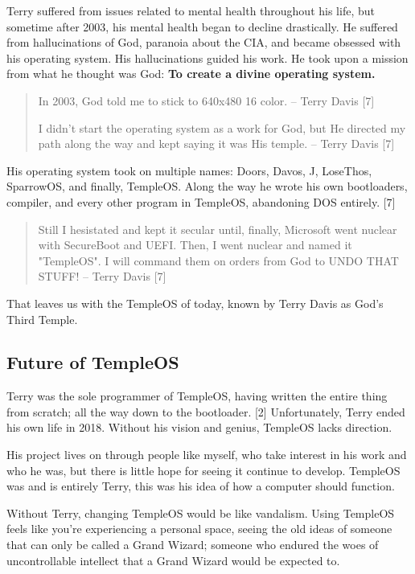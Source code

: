 \documentclass[11pt]{article}
\begin{document}
\newpage

Terry suffered from issues related to mental health throughout his life, but
sometime after 2003, his mental health began to decline drastically. He suffered
from hallucinations of God, paranoia about the CIA, and became obsessed with his
operating system. His hallucinations guided his work. He took upon a mission
from what he thought was God: \textbf{To create a divine operating system.}

\begin{quote}
In 2003, God told me to stick to 640x480 16 color. -- Terry Davis [7]

I didn't start the operating system as a work for God, but He directed my path
along the way and kept saying it was His temple. -- Terry Davis [7]
\end{quote}

His operating system took on multiple names: Doors, Davos, J, LoseThos,
SparrowOS, and finally, TempleOS. Along the way he wrote his own bootloaders,
compiler, and every other program in TempleOS, abandoning DOS entirely. [7]

\begin{quote}
Still I hesistated and kept it secular until, finally, Microsoft went nuclear
with SecureBoot and UEFI. Then, I went nuclear and named it "TempleOS". I will
command them on orders from God to UNDO THAT STUFF! -- Terry Davis [7]
\end{quote}

That leaves us with the TempleOS of today, known by Terry Davis as God's
Third Temple.

 \newpage

\subsection{Future of TempleOS}
\label{sec:orgb8d4e4b}

Terry was the sole programmer of TempleOS, having written the entire thing from
scratch; all the way down to the bootloader. [2] Unfortunately, Terry ended his
own life in 2018. Without his vision and genius, TempleOS lacks direction.

His project lives on through people like myself, who take interest in his work
and who he was, but there is little hope for seeing it continue to develop.
TempleOS was and is entirely Terry, this was his idea of how a computer should
function.

Without Terry, changing TempleOS would be like vandalism. Using TempleOS feels
like you're experiencing a personal space, seeing the old ideas of someone that
can only be called a Grand Wizard; someone who endured the woes of uncontrollable
intellect that a Grand Wizard would be expected to.
\end{document}
